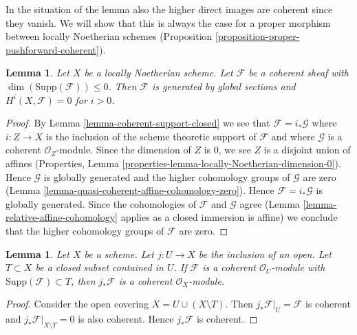 \documentclass{stacks-project}
\theoremstyle{plain}
\newtheorem{lemma}[subsection]{Lemma}
\theoremstyle{definition}
\theoremstyle{remark}
\numberwithin{equation}{subsection}
\begin{document}
\noindent
In the situation of the lemma also the higher direct images are
coherent since they vanish.
We will show that this is always the case for a proper morphism
between locally Noetherian schemes
(Proposition \ref{proposition-proper-pushforward-coherent}).

\begin{lemma}
\label{lemma-coherent-support-dimension-0}
Let $X$ be a locally Noetherian scheme. Let $\mathcal{F}$
be a coherent sheaf with $\dim(\text{Supp}(\mathcal{F})) \leq 0$.
Then $\mathcal{F}$ is generated by global sections and
$H^i(X, \mathcal{F}) = 0$ for $i > 0$.
\end{lemma}

\begin{proof}
By Lemma \ref{lemma-coherent-support-closed} we see that
$\mathcal{F} = i_*\mathcal{G}$ where $i : Z \to X$ is the inclusion
of the scheme theoretic support of $\mathcal{F}$ and where $\mathcal{G}$
is a coherent $\mathcal{O}_Z$-module. Since the dimension of $Z$ is
$0$, we see $Z$ is a disjoint union of affines (Properties, Lemma
\ref{properties-lemma-locally-Noetherian-dimension-0}).
Hence $\mathcal{G}$ is globally generated and the higher
cohomology groups of $\mathcal{G}$ are zero
(Lemma \ref{lemma-quasi-coherent-affine-cohomology-zero}).
Hence $\mathcal{F} = i_*\mathcal{G}$ is globally generated.
Since the cohomologies of $\mathcal{F}$ and $\mathcal{G}$ agree
(Lemma \ref{lemma-relative-affine-cohomology} applies as a
closed immersion is affine)
we conclude that the higher cohomology groups of $\mathcal{F}$ are zero.
\end{proof}

\begin{lemma}
\label{lemma-pushforward-coherent-on-open}
Let $X$ be a scheme. Let $j : U \to X$ be the inclusion of an open.
Let $T \subset X$ be a closed subset contained in $U$.
If $\mathcal{F}$ is a coherent $\mathcal{O}_U$-module
with $\text{Supp}(\mathcal{F}) \subset T$, then
$j_*\mathcal{F}$ is a coherent $\mathcal{O}_X$-module.
\end{lemma}

\begin{proof}
Consider the open covering $X = U \cup (X \setminus T)$.
Then $j_*\mathcal{F}|_U = \mathcal{F}$ is coherent and
$j_*\mathcal{F}|_{X \setminus T} = 0$ is also coherent.
Hence $j_*\mathcal{F}$ is coherent.
\end{proof}
\end{document}
